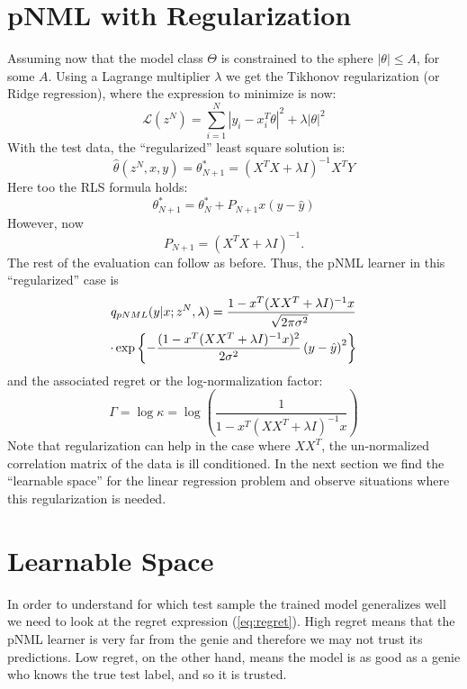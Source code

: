 \documentclass[conference,letterpaper]{IEEEtran}
\begin{document}
\section{pNML with Regularization} \label{sec:pNMLwithReg}
Assuming now that the model class $\Theta$ is constrained to the sphere  $|\theta|\leq A$, for some $A$. 
Using a Lagrange multiplier $\lambda$ we get the Tikhonov regularization (or Ridge regression), where the expression to minimize is now: 
\begin{equation}
\mathcal{L}(z^N)= \sum_{i=1}^{N}|y_i-x_i^T \theta|^2 + \lambda |\theta|^2
\end{equation}
With the test data, the ``regularized'' least square solution is:
\begin{equation}
\hat{\theta}(z^N,x,y) = \theta_{N+1}^* = (X^T X+ \lambda I)^{-1} X^T Y
\end{equation}
Here too the RLS formula holds: 
\begin{equation}
\theta_{N+1}^*=\theta^*_{N} + P_{N+1} x (y - \hat{y})
\end{equation}
However, now 
\begin{equation}
P_{N+1}= (X^T X+ \lambda I)^{-1}.    
\end{equation}
The rest of the evaluation can follow as before. 
Thus, the pNML learner in this ``regularized'' case is 
\begin{multline} \label{eq:pNML_least_sqaures}
q_{\mbox{\tiny{pNML}}}(y|x; z^N, \lambda)
=\frac{1 - x^T (XX^T + \lambda I)^{-1} x }{\sqrt[]{2\pi\sigma^2}} \\
\cdot \exp\left\{-\frac{(1 - x^T (XX^T + \lambda I)^{-1} x )^2 }{2\sigma^2}\left(y- \hat{y} \right)^2\right\} \\
\end{multline}
and the associated regret or the log-normalization factor:
\begin{equation}
\Gamma = \log \kappa = \log \left( \frac{1}{1 - x^T (XX^T + \lambda I)^{-1} x } \right)
\end{equation}
Note that regularization can help in the case where $XX^T$, the un-normalized correlation matrix of the data is
ill conditioned. 
In the next section we find the ``learnable space'' for the linear regression problem and observe situations where this regularization is needed.

\section{Learnable Space} \label{sec:learnable_space}
In order to understand for which test sample the trained model generalizes well we need to look at the regret expression (\ref{eq:regret}). 
High regret means that the pNML learner is very far from the genie and therefore we may not trust its predictions. 
Low regret, on the other hand, means the model is as good as a genie who knows the true test label, and so it is trusted.
\end{document}
